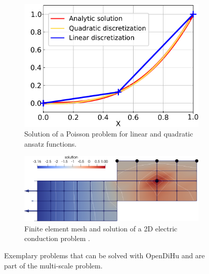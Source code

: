 \begin{figure}
  \centering%
  \begin{subfigure}[t]{0.38\textwidth}%
    \centering%
    \includegraphics[width=\textwidth]{images/results/basic/analytic.pdf}%
    \caption{Solution of a Poisson problem for linear and quadratic ansatz functions.}%
    \label{fig:poisson}%
  \end{subfigure}\quad
  \begin{subfigure}[t]{0.58\textwidth}%
    \centering%
    \includegraphics[width=\textwidth]{images/results/basic/laplace_composite_1.png}%
    \caption{Finite element mesh and solution of a 2D electric conduction problem .}%
    \label{fig:laplace_composite_1}%
  \end{subfigure}
  \caption{Exemplary problems that can be solved with OpenDiHu and are part of the multi-scale problem.}%
  \label{fig:diffusion}%
\end{figure}%

